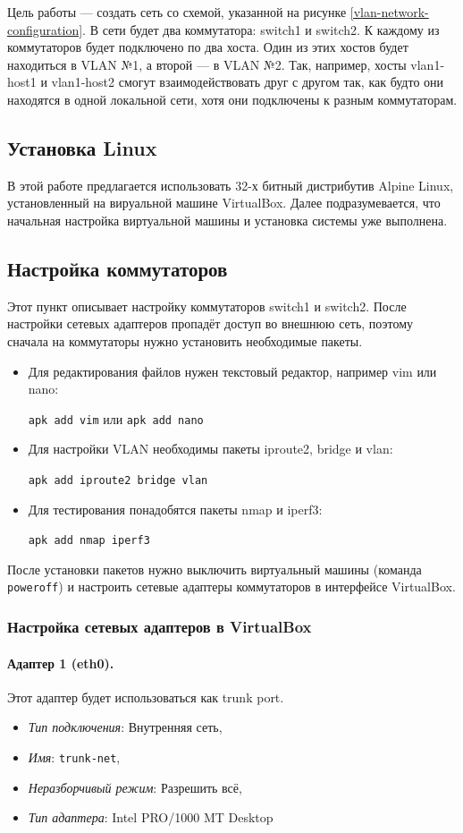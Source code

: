 \documentclass{article}
\begin{document}
Цель работы --- создать сеть со схемой, указанной на рисунке \ref{vlan-network-configuration}. 
В сети будет два коммутатора: switch1 и switch2. К каждому из коммутаторов будет подключено по два хоста. Один из этих хостов будет находиться в VLAN №1, а второй --- в VLAN №2. Так, например, хосты vlan1-host1 и vlan1-host2 смогут взаимодействовать друг с другом так, как будто они находятся в одной локальной сети, хотя они подключены к разным коммутаторам.

\subsection{Установка Linux}
В этой работе предлагается использовать 32-х битный дистрибутив Alpine Linux, установленный на вируальной машине VirtualBox. Далее подразумевается, что начальная настройка виртуальной машины и установка системы уже выполнена.

\subsection{Настройка коммутаторов}
Этот пункт описывает настройку коммутаторов switch1 и switch2. После настройки сетевых адаптеров пропадёт доступ во внешнюю сеть, поэтому сначала на коммутаторы нужно установить необходимые пакеты. 
\begin{itemize}
    \itemsep0em 
    \item Для редактирования файлов нужен текстовый редактор, например vim или nano:
    
    \verb|apk add vim| или \verb|apk add nano|
    \item Для настройки VLAN необходимы пакеты iproute2, bridge и vlan:
    
    \verb|apk add iproute2 bridge vlan|
    \item Для тестирования понадобятся пакеты nmap и iperf3:
    
    \verb|apk add nmap iperf3|
\end{itemize}
После установки пакетов нужно выключить виртуальный машины (команда \verb|poweroff|) и настроить сетевые адаптеры коммутаторов в интерфейсе VirtualBox.

\subsubsection{Настройка сетевых адаптеров в VirtualBox}

\paragraph{Адаптер 1 (eth0).} Этот адаптер будет использоваться как trunk port.
\begin{itemize}
    \itemsep0em 
    \item \emph{Тип подключения}: Внутренняя сеть,
    \item \emph{Имя}: \verb|trunk-net|,
    \item \emph{Неразборчивый режим}: Разрешить всё, 
    \item \emph{Тип адаптера}: Intel PRO/1000 MT Desktop
\end{itemize}
\end{document}
